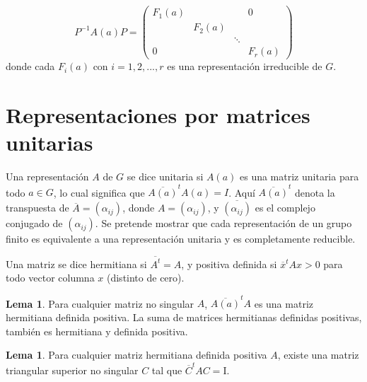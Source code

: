 \documentclass[12pt]{book}
\theoremstyle{definition}
\newtheorem{lemma}[theorem]{Lema}
\newcounter{in}
\newcounter{ini}
\begin{document}
\begin{equation*}
 P^{-1}A\left(a\right)P=
 \begin{pmatrix}
   F_{1}(a) & & & 0\\
   & F_{2}(a) & & \\
   & & \ddots & \\
   0 & & & F_{r}(a)
 \end{pmatrix}
\end{equation*}
donde cada $F_{i}\left(a\right)$ con $i=1,2,...,r$ es una
representación irreducible de $G$.

\section{Representaciones por matrices unitarias}
\label{sec:munitarias}

Una representación $A$ de $G$ se dice unitaria si $A\left(a\right)$ es
una matriz unitaria para todo $a \in G$, lo cual significa que
$\overline{A\left(a\right)}^{t}A\left(a\right)=I$. Aquí
$\overline{A\left(a\right)}^{t}$ denota la transpuesta de
$\overline{A}=\left(\alpha_{ij}\right)$, donde
$A=\left(\alpha_{ij}\right)$, y $\overline{\left(\alpha_{ij}\right)}$
es el complejo conjugado de $\left(\alpha_{ij}\right)$. Se pretende
mostrar que cada representación de un grupo finito es equivalente a
una representación unitaria y es completamente reducible.

Una matriz se dice hermitiana si $\overline{A^{t}}=A$, y positiva
definida si $\overline{x}^{t}Ax>0$ para todo vector columna $x$
(distinto de cero).

\begin{lemma}
  \label{l2_1}
  Para cualquier matriz no singular $A$,
  $\overline{A\left(a\right)}^{t}A$ es una matriz hermitiana definida
  positiva. La suma de matrices hermitianas definidas positivas,
  también es hermitiana y definida positiva.

\end{lemma}

\begin{lemma}
  \label{l2_2}
   Para cualquier matriz hermitiana definida positiva
$A$, existe una matriz triangular superior no singular $C$ tal que
$\overline{C}^{t}AC=\mathrm{I}$.
\end{lemma}
\end{document}
